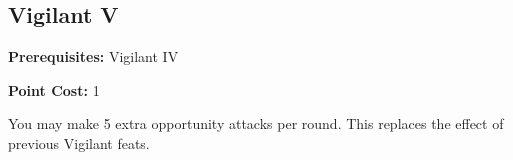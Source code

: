 \subsection*{Vigilant V}\label{feat:vigilant5}

\noindent
\textbf{Prerequisites:} Vigilant IV

\noindent
\textbf{Point Cost:} 1

You may make 5 extra opportunity attacks per round. This replaces the effect
of previous Vigilant feats.
